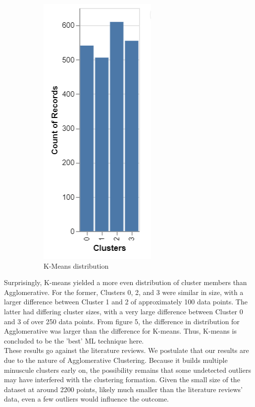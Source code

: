 \documentclass[12pt]{article}
\begin{document}
\begin{figure}[H]
\begin{subfigure}{0.48\textwidth}
    \includegraphics[scale = 0.5]{figures/KMeans_distribution.PNG}
    \caption{K-Means distribution}
  \end{subfigure}
  \caption{}
\end{figure}

\noindent Surprisingly, K-means yielded a more even distribution of cluster members than Agglomerative. For the former, Clusters 0, 2, and 3 were similar in size, with a larger difference between Cluster 1 and 2 of approximately 100 data points. The latter had differing cluster sizes, with a very large difference between Cluster 0 and 3 of over 250 data points. From figure 5, the difference in distribution for Agglomerative was larger than the difference for K-means. Thus, K-means is concluded to be the 'best' ML technique here.\\

\noindent These results go against the literature reviews. We postulate that our results are due to the nature of Agglomerative Clustering. Because it builds multiple minuscule clusters early on, the possibility remains that some undetected outliers may have interfered with the clustering formation. Given the small size of the dataset at around 2200 points, likely much smaller than the literature reviews' data, even a few outliers would influence the outcome.\\
\end{document}
